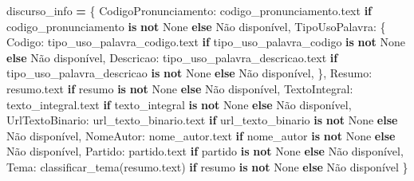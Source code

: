 \documentclass[
]{article}
\newenvironment{Shaded}{\begin{snugshade}}{\end{snugshade}}
\newcommand{\ControlFlowTok}[1]{\textcolor[rgb]{0.13,0.29,0.53}{\textbf{#1}}}
\newcommand{\KeywordTok}[1]{\textcolor[rgb]{0.13,0.29,0.53}{\textbf{#1}}}
\newcommand{\NormalTok}[1]{#1}
\newcommand{\OperatorTok}[1]{\textcolor[rgb]{0.81,0.36,0.00}{\textbf{#1}}}
\newcommand{\StringTok}[1]{\textcolor[rgb]{0.31,0.60,0.02}{#1}}
\newcommand{\VariableTok}[1]{\textcolor[rgb]{0.00,0.00,0.00}{#1}}
\begin{document}
\begin{Shaded}
\begin{Highlighting}[]
\NormalTok{                discurso\_info }\OperatorTok{=}\NormalTok{ \{}
                    \StringTok{\textquotesingle{}CodigoPronunciamento\textquotesingle{}}\NormalTok{: codigo\_pronunciamento.text }\ControlFlowTok{if}\NormalTok{ codigo\_pronunciamento }\KeywordTok{is} \KeywordTok{not} \VariableTok{None} \ControlFlowTok{else} \StringTok{\textquotesingle{}Não disponível\textquotesingle{}}\NormalTok{,}
                    \StringTok{\textquotesingle{}TipoUsoPalavra\textquotesingle{}}\NormalTok{: \{}
                        \StringTok{\textquotesingle{}Codigo\textquotesingle{}}\NormalTok{: tipo\_uso\_palavra\_codigo.text }\ControlFlowTok{if}\NormalTok{ tipo\_uso\_palavra\_codigo }\KeywordTok{is} \KeywordTok{not} \VariableTok{None} \ControlFlowTok{else} \StringTok{\textquotesingle{}Não disponível\textquotesingle{}}\NormalTok{,}
                        \StringTok{\textquotesingle{}Descricao\textquotesingle{}}\NormalTok{: tipo\_uso\_palavra\_descricao.text }\ControlFlowTok{if}\NormalTok{ tipo\_uso\_palavra\_descricao }\KeywordTok{is} \KeywordTok{not} \VariableTok{None} \ControlFlowTok{else} \StringTok{\textquotesingle{}Não disponível\textquotesingle{}}\NormalTok{,}
\NormalTok{                    \},}
                    \StringTok{\textquotesingle{}Resumo\textquotesingle{}}\NormalTok{: resumo.text }\ControlFlowTok{if}\NormalTok{ resumo }\KeywordTok{is} \KeywordTok{not} \VariableTok{None} \ControlFlowTok{else} \StringTok{\textquotesingle{}Não disponível\textquotesingle{}}\NormalTok{,}
                    \StringTok{\textquotesingle{}TextoIntegral\textquotesingle{}}\NormalTok{: texto\_integral.text }\ControlFlowTok{if}\NormalTok{ texto\_integral }\KeywordTok{is} \KeywordTok{not} \VariableTok{None} \ControlFlowTok{else} \StringTok{\textquotesingle{}Não disponível\textquotesingle{}}\NormalTok{,}
                    \StringTok{\textquotesingle{}UrlTextoBinario\textquotesingle{}}\NormalTok{: url\_texto\_binario.text }\ControlFlowTok{if}\NormalTok{ url\_texto\_binario }\KeywordTok{is} \KeywordTok{not} \VariableTok{None} \ControlFlowTok{else} \StringTok{\textquotesingle{}Não disponível\textquotesingle{}}\NormalTok{,}
                    \StringTok{\textquotesingle{}NomeAutor\textquotesingle{}}\NormalTok{: nome\_autor.text }\ControlFlowTok{if}\NormalTok{ nome\_autor }\KeywordTok{is} \KeywordTok{not} \VariableTok{None} \ControlFlowTok{else} \StringTok{\textquotesingle{}Não disponível\textquotesingle{}}\NormalTok{,}
                    \StringTok{\textquotesingle{}Partido\textquotesingle{}}\NormalTok{: partido.text }\ControlFlowTok{if}\NormalTok{ partido }\KeywordTok{is} \KeywordTok{not} \VariableTok{None} \ControlFlowTok{else} \StringTok{\textquotesingle{}Não disponível\textquotesingle{}}\NormalTok{,}
                    \StringTok{\textquotesingle{}Tema\textquotesingle{}}\NormalTok{: classificar\_tema(resumo.text) }\ControlFlowTok{if}\NormalTok{ resumo }\KeywordTok{is} \KeywordTok{not} \VariableTok{None} \ControlFlowTok{else} \StringTok{\textquotesingle{}Não disponível\textquotesingle{}}
\NormalTok{                \}}


\end{Highlighting}
\end{Shaded}
\end{document}
